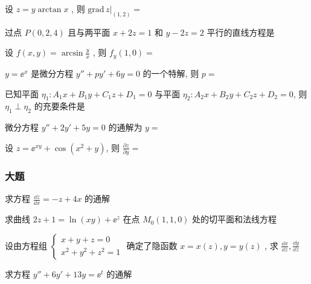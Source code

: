 \begin{ti}
	设 $z=y\arctan x$ , 则 $\left.\mathrm{grad}\,z\right|_{(1,2)}=$ \hua{}
\end{ti}

\begin{ti}
	过点 $P(0,2,4)$ 且与两平面 $x+2z=1$ 和 $y-2z=2$ 平行的直线方程是 \hua{}
\end{ti}

\begin{ti}
	设 $f(x,y)=\arcsin\frac{y}{x}$ , 则 $f_y(1,0)=$ \hua{}
\end{ti}

\begin{ti}
	$y=\ee^x$ 是微分方程 $y''+py'+6y=0$ 的一个特解, 则 $p=$ \hua{}
\end{ti}

\begin{ti}
	已知平面 $\eta_1:A_1x+B_1y+C_1z+D_1=0$ 与平面 $\eta_2:A_2x+B_2y+C_2z+D_2=0$, 则 $\eta_1\perp\eta_2$ 的充要条件是 \hua{}
\end{ti}

\begin{ti}
	微分方程 $y''+2y'+5y=0$ 的通解为 $y=$ \hua{}
\end{ti}

\begin{ti}
	设 $z=\ee^{xy}+\cos\left(x^2+y\right)$, 则 $\frac{\partial z}{\partial y}=$ \hua{}
\end{ti}

\subsubsection{大题}
\begin{ti}
	求方程 $\frac{\dd{z}}{\dd{x}}=-z+4x$ 的通解
\end{ti}

\begin{ti}
	求曲线 $2z+1=\ln(xy)+\ee^z$ 在点 $M_{0}(1,1,0)$ 处的切平面和法线方程
\end{ti}

\begin{ti}
	设由方程组 $\begin{cases}
	x+y+z=0\\
	x^2+y^2+z^2=1
	\end{cases}$
	确定了隐函数 $x=x(z),y=y(z)$ , 求 $\frac{\dd{x}}{\dd{z}},\frac{\dd{y}}{\dd{z}}$
\end{ti}

\begin{ti}
	求方程 $y''+6y'+13y=\ee^t$ 的通解
\end{ti}

